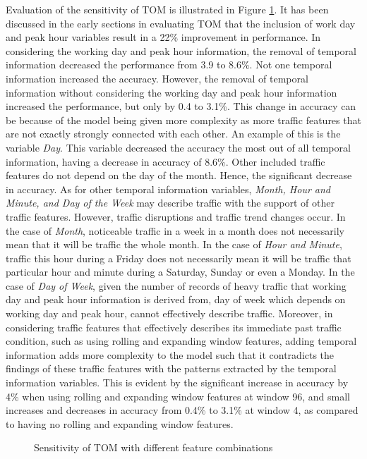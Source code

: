 Evaluation of the sensitivity of TOM is illustrated in Figure \ref{fig:TOM_sensitivity}. It has been discussed in the early sections in evaluating TOM that the inclusion of work day and peak hour variables result in a 22\% improvement in performance. In considering the working day and peak hour information, the removal of temporal information decreased the performance from 3.9 to 8.6\%. Not one temporal information increased the accuracy. However, the removal of temporal information without considering the working day and peak hour information increased the performance, but only by 0.4 to 3.1\%. This change in accuracy can be because of the model being given more complexity as more traffic features that are not exactly strongly connected with each other. An example of this is the variable \textit{Day}. This variable decreased the accuracy the most out of all temporal information, having a decrease in accuracy of 8.6\%. Other included traffic features do not depend on the day of the month. Hence, the significant decrease in accuracy. As for other temporal information variables, \textit{Month, Hour and Minute, and Day of the Week} may describe traffic with the support of other traffic features. However, traffic disruptions and traffic trend changes occur. In the case of \textit{Month}, noticeable traffic in a week in a month does not necessarily mean that it will be traffic the whole month. In the case of \textit{Hour and Minute}, traffic this hour during a Friday does not necessarily mean it will be traffic that particular hour and minute during a Saturday, Sunday or even a Monday. In the case of \textit{Day of Week}, given the number of records of heavy traffic that working day and peak hour information is derived from, day of week which depends on working day and peak hour, cannot effectively describe traffic. Moreover, in considering traffic features that effectively describes its immediate past traffic condition, such as using rolling and expanding window features, adding temporal information adds more complexity to the model such that it contradicts the findings of these traffic features with the patterns extracted by the temporal information variables. This is evident by the significant increase in accuracy by 4\% when using rolling and expanding window features at window 96, and small increases and decreases in accuracy from 0.4\% to 3.1\% at window 4, as compared to having no rolling and expanding window features. 

\begin{figure}[h]
  \centering
  \captionsetup{justification=centering}
  \caption{Sensitivity of TOM with different feature combinations}
  \label{fig:TOM_sensitivity}
\end{figure}

